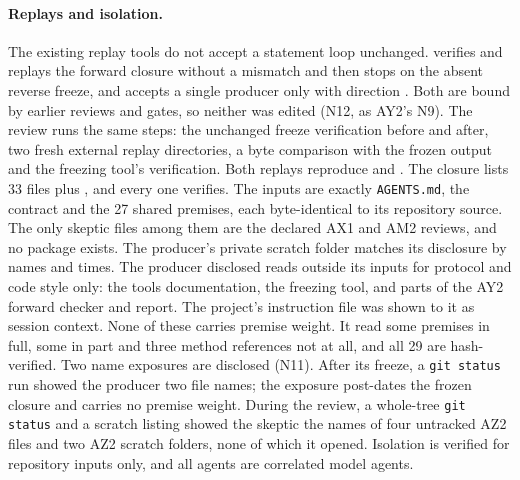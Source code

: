 \paragraph{Replays and isolation.}
The existing replay tools do not accept a statement loop unchanged.
 verifies and replays the forward closure without
a mismatch and then stops on the absent reverse freeze, and
 accepts a single producer only with direction
. Both are bound by earlier reviews and gates, so
neither was edited (N12, as AY2's N9). The review runs the same steps: the
unchanged freeze verification before and after, two fresh external replay
directories, a byte comparison with the frozen output and the freezing tool's
verification. Both replays reproduce  and
. The closure lists 33 files plus
, and every one verifies. The inputs are exactly
\texttt{AGENTS.md}, the contract and the 27 shared premises, each
byte-identical to its repository source. The only skeptic files among them
are the declared AX1 and AM2 reviews, and no  package
exists. The producer's private scratch folder matches its disclosure by names
and times. The producer disclosed reads outside its inputs for protocol and
code style only: the tools documentation, the freezing tool, and parts of the
AY2 forward checker and report. The project's instruction file was shown to
it as session context. None of these carries premise weight. It read some
premises in full, some in part and three method references not at all, and
all 29 are hash-verified. Two name exposures are disclosed (N11). After its
freeze, a \texttt{git status} run showed the producer two file names; the
exposure post-dates the frozen closure and carries no premise weight. During
the review, a whole-tree \texttt{git status} and a scratch listing showed the
skeptic the names of four untracked AZ2 files and two AZ2 scratch folders,
none of which it opened. Isolation is verified for repository inputs only,
and all agents are correlated model agents.

